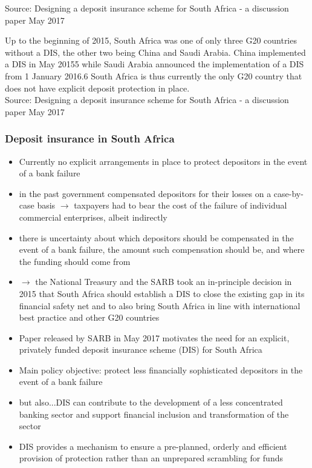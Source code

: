 \documentclass[11pt]{beamer}
\begin{document}

%
\begin{frame}
\begin{center}
\end{center}
\tiny{Source: Designing a deposit insurance scheme for South Africa - a discussion paper May 2017}
\end{frame}

\begin{frame}
Up to the beginning of 2015, South Africa was one of only three G20 countries without a DIS, the other two being China and Saudi Arabia. China implemented a DIS in May 20155 while Saudi Arabia announced the implementation of a DIS from 1 January 2016.6 South Africa is thus currently the only G20 country that does not have explicit deposit protection in place.\\
\tiny{Source: Designing a deposit insurance scheme for South Africa - a discussion paper May 2017}
\end{frame}


\begin{frame}
\frametitle{Deposit insurance in South Africa}
\begin{itemize}
\item Currently no explicit arrangements in place to protect depositors in the event of a bank failure
\item in the past government compensated depositors for their losses on a case-by-case basis $\rightarrow$  taxpayers had to bear the cost of the failure of individual commercial enterprises, albeit indirectly
\item there is uncertainty about which depositors should be compensated in the event of a bank failure, the amount such compensation should be, and where the funding should come from
\item $\rightarrow$ the National Treasury and the SARB took an in-principle decision in 2015 that South Africa should establish a DIS to close the existing gap in its financial safety net and to also bring South Africa in line with international best practice and other G20 countries
\end{itemize}
\end{frame}


\begin{frame}
\begin{itemize}
\item Paper released by SARB in May 2017 motivates the need for an explicit, privately funded deposit insurance scheme (DIS) for South Africa
\item Main policy objective: protect less financially sophisticated depositors in the event of a bank failure
\item but also...DIS can contribute to the development of a less concentrated banking sector and support financial inclusion and transformation of the sector
\item DIS provides a mechanism to ensure a pre-planned, orderly and efficient provision
of protection rather than an unprepared scrambling for funds
\end{itemize}
\end{frame}
\end{document}
